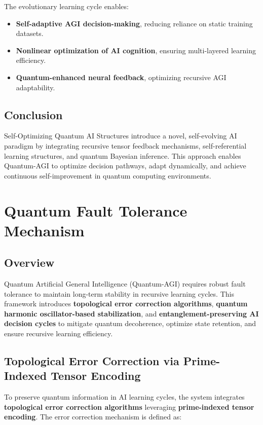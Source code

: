 \documentclass{article}
\theoremstyle{plain}
\begin{document}
The evolutionary learning cycle enables:
\begin{itemize}
    \item \textbf{Self-adaptive AGI decision-making}, reducing reliance on static training datasets.
    \item \textbf{Nonlinear optimization of AI cognition}, ensuring multi-layered learning efficiency.
    \item \textbf{Quantum-enhanced neural feedback}, optimizing recursive AGI adaptability.
\end{itemize}

\subsection{Conclusion}

Self-Optimizing Quantum AI Structures introduce a novel, self-evolving AI paradigm by integrating recursive tensor feedback mechanisms, self-referential learning structures, and quantum Bayesian inference. This approach enables Quantum-AGI to optimize decision pathways, adapt dynamically, and achieve continuous self-improvement in quantum computing environments.

\section{Quantum Fault Tolerance Mechanism}

\subsection{Overview}

Quantum Artificial General Intelligence (Quantum-AGI) requires robust fault tolerance to maintain long-term stability in recursive learning cycles. This framework introduces \textbf{topological error correction algorithms}, \textbf{quantum harmonic oscillator-based stabilization}, and \textbf{entanglement-preserving AI decision cycles} to mitigate quantum decoherence, optimize state retention, and ensure recursive learning efficiency.

\subsection{Topological Error Correction via Prime-Indexed Tensor Encoding}

To preserve quantum information in AI learning cycles, the system integrates \textbf{topological error correction algorithms} leveraging \textbf{prime-indexed tensor encoding}. The error correction mechanism is defined as:
\end{document}
